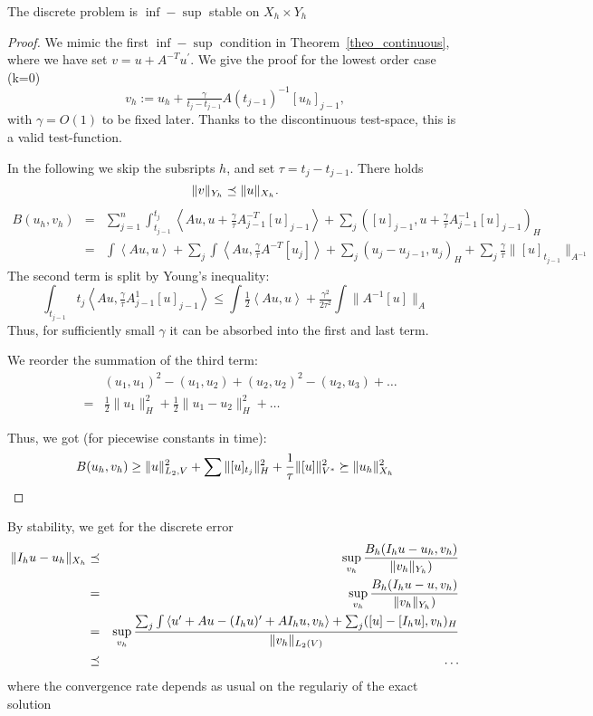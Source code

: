 \begin{theorem}
The discrete problem is $\inf-\sup$ stable on $X_h \times Y_h$ 
\end{theorem}
\begin{proof} We mimic the first $\inf-\sup$ condition in Theorem~\ref{theo_continuous}, where we have set $v = u + A^{-T} u^\prime$. We give the proof for the lowest order case (k=0)
$$
v_h := u_h + \tfrac{\gamma}{t_j - t_{j-1}} A(t_{j-1})^{-1}  [u_h]_{j-1},
$$
with $\gamma = O(1)$ to be fixed later. Thanks to the discontinuous test-space, this is a valid test-function. 

In the following we skip the subsripts $h$, and set $\tau = t_{j} - t_{j-1}$. 
There holds
$$
\| v \|_{Y_h} \preceq \| u \|_{X_h}.
$$
\begin{eqnarray*}
B(u_h, v_h) & = & \sum_{j=1}^n \int_{t_{j-1}}^{t_j} \left< A u, u + \tfrac{\gamma}{\tau}  A_{j-1}^{-T} [u]_{j-1} \right> + 
\sum_j ([u]_{j-1}, u + \tfrac{\gamma}{\tau} A_{j-1}^{-1} [u]_{j-1})_H \\
& = & \int \left< A u, u \right> + \sum_j \int \left< A u, \tfrac{\gamma}{\tau} A^{-T} [u_j]  \right> +
 \sum_j ( u_j - u_{j-1}, u_j)_H + \sum_j \tfrac{\gamma}{\tau} \| [u]_{t_{j-1}}\|_{A^{-1}} 
\end{eqnarray*}
The second term is split by Young's inequality:
$$
\int_{t_{j-1}}{t_j} \left< A u, \tfrac{\gamma}{\tau}  A^{1}_{j-1} [u]_{j-1} \right> \leq \int \tfrac{1}{2} \left<A u, u \right> + \tfrac{\gamma^2}{2 \tau^2}  \int \| A^{-1} [u] \|_A 
$$
Thus, for sufficiently small $\gamma$ it can be absorbed into the first and last term.

We reorder the summation of the third term:
\begin{eqnarray*}
& & (u_1, u_1)^2 - (u_1, u_2) + (u_2, u_2)^2 - (u_2, u_3) + \ldots \\
& = &\tfrac{1}{2} \| u_1 \|_H^2 + \tfrac{1}{2}  \| u_1 - u_2 \|_H^2 + \ldots
\end{eqnarray*} 

Thus, we got (for piecewise  constants in time):
$$
B(u_h, v_h) \geq \| u \|_{L_2,V}^2 + \sum \| [u]_{t_j} \|_H^2 + \frac{1}{\tau} \| [u] \|_{V^\ast}^2 \succeq \| u_h \|_{X_h}^2 
$$
\end{proof}

By stability, we get for the discrete error
\begin{eqnarray*} 
\| I_h u - u_h \|_{X_h}  & \preceq & \sup_{v_h}  \frac{B_h(I_h u - u_h, v_h)} {\| v_h \|_{Y_h} )} \\
 & = & \sup_{v_h}  \frac{B_h(I_h u - u, v_h)} {\| v_h \|_{Y_h} )} \\
 & = & \sup_{v_h}  \frac{ \sum_j \int \left< u^\prime + A u - (I_h u)^\prime + A I_h u, v_h \right> + \sum_j ( [u]  - [I_h u] , v_h)_H }
{ \| v_h \|_{L_2(V)} }  \\
& \preceq & \ldots
\end{eqnarray*} 
where the convergence rate depends as usual on the regulariy of the exact solution 


